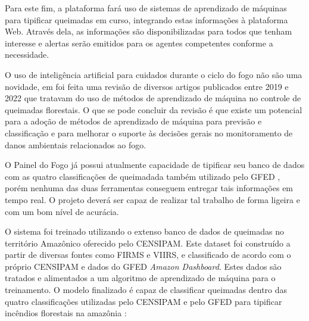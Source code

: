 Para este fim, a plataforma fará uso de sistemas de aprendizado de máquinas para tipificar queimadas em curso, integrando estas informações à plataforma Web. Através dela, as informações são disponibilizadas para todos que tenham interesse e alertas serão emitidos para os agentes competentes conforme a necessidade.

O uso de inteligência artificial para cuidados durante o ciclo do fogo não são uma novidade, em \cite{invention} foi feita uma revisão de diversos artigos publicados entre 2019 e 2022 que tratavam do uso de métodos de aprendizado de máquina no controle de queimadas florestais. O que se pode concluir da revisão é que existe um potencial para a adoção de métodos de aprendizado de máquina para previsão e classificação e para melhorar o suporte às decisões gerais no monitoramento de danos ambientais relacionados ao fogo.

O Painel do Fogo já possui atualmente capacidade de tipificar seu banco de dados com as quatro classificações de queimadada também utilizado pelo GFED \cite{andela}, porém nenhuma das duas ferramentas conseguem entregar tais informações em tempo real. O projeto deverá ser capaz de realizar tal trabalho de forma ligeira e com um bom nível de acurácia.

O sistema foi treinado utilizando o extenso banco de dados de queimadas no território Amazônico oferecido pelo CENSIPAM. Este dataset foi construído a partir de diversas fontes como FIRMS e VIIRS, e classificado de acordo com o próprio CENSIPAM e dados do GFED \textit{Amazon Dashboard}. Estes dados são tratados e alimentados a um algoritmo de aprendizado de máquina para o treinamento. O modelo finalizado é capaz de classificar queimadas dentro das quatro classificações utilizadas pelo CENSIPAM e pelo GFED para tipificar incêndios florestais na amazônia \cite{andela}: 


